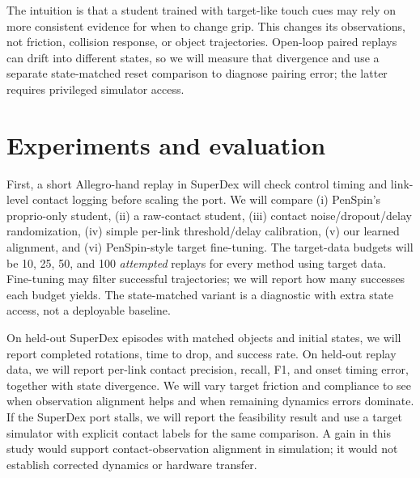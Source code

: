 \documentclass{article}
\begin{document}
The intuition is that a student trained with target-like touch cues may rely on more consistent evidence for when to change grip. This changes its observations, not friction, collision response, or object trajectories. Open-loop paired replays can drift into different states, so we will measure that divergence and use a separate state-matched reset comparison to diagnose pairing error; the latter requires privileged simulator access.

\section{Experiments and evaluation}
First, a short Allegro-hand replay in SuperDex will check control timing and link-level contact logging before scaling the port. We will compare (i) PenSpin's proprio-only student, (ii) a raw-contact student, (iii) contact noise/dropout/delay randomization, (iv) simple per-link threshold/delay calibration, (v) our learned alignment, and (vi) PenSpin-style target fine-tuning. The target-data budgets will be 10, 25, 50, and 100 \emph{attempted} replays for every method using target data. Fine-tuning may filter successful trajectories; we will report how many successes each budget yields. The state-matched variant is a diagnostic with extra state access, not a deployable baseline.

On held-out SuperDex episodes with matched objects and initial states, we will report completed rotations, time to drop, and success rate. On held-out replay data, we will report per-link contact precision, recall, F1, and onset timing error, together with state divergence. We will vary target friction and compliance to see when observation alignment helps and when remaining dynamics errors dominate. If the SuperDex port stalls, we will report the feasibility result and use a target simulator with explicit contact labels for the same comparison. A gain in this study would support contact-observation alignment in simulation; it would not establish corrected dynamics or hardware transfer.


\end{document}
